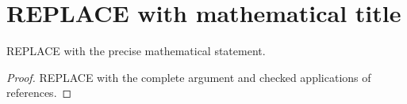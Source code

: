 \section{REPLACE with mathematical title}
\label{sec:REPLACE}
\begin{proposition}
\label{prop:REPLACE}
REPLACE with the precise mathematical statement.
\end{proposition}
\begin{proof}
REPLACE with the complete argument and checked applications of references.
\end{proof}
